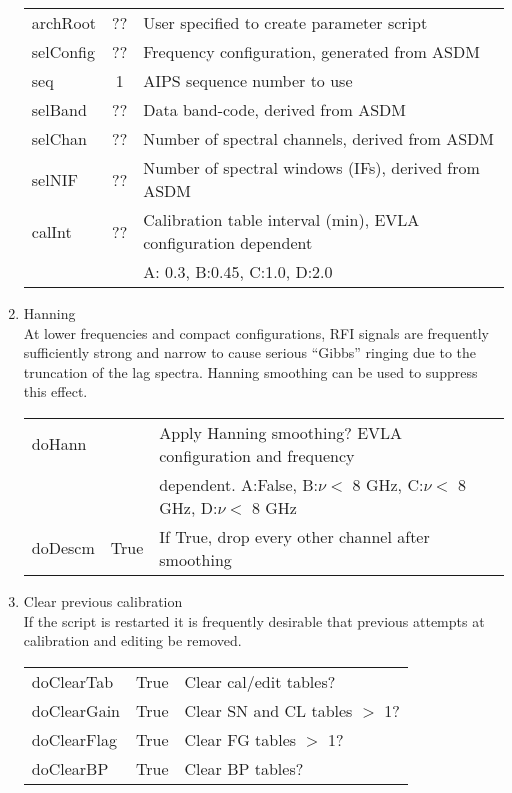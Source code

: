 \documentclass[11pt]{article}
\begin{document}
\begin{enumerate}
\begin{center}
\begin{tabular}{|l|c|l|}
archRoot  & ?? &  User specified to create parameter script\\
selConfig  & ?? &  Frequency configuration, generated from ASDM\\
seq     & 1   &  AIPS sequence number to use \\
selBand & ??  &  Data band-code, derived from ASDM\\
selChan & ??  &  Number of spectral channels, derived from ASDM\\
selNIF  & ??  &  Number of spectral windows (IFs), derived from ASDM\\
calInt  & ??  &  Calibration table interval (min), EVLA configuration
dependent\\
  &  & A: 0.3, B:0.45, C:1.0, D:2.0\\
\hline
\end{tabular}
\end{center}
%
\item Hanning \\
At lower frequencies and compact configurations, RFI signals are
frequently sufficiently strong and narrow to cause serious ``Gibbs''
ringing due to the truncation of the lag spectra.
Hanning smoothing can be used to suppress this effect.
\begin{center}
\begin{tabular}{|l|c|l|}
\hline
doHann  &  &  Apply Hanning smoothing? EVLA configuration
 and frequency \\
  &  & dependent. A:False, B:$\nu<$ 8 GHz, C:$\nu<$ 8 GHz, D:$\nu<$ 8 GHz\\
doDescm  & True  & If True, drop every other channel after smoothing  \\
\hline
\end{tabular}
\end{center}
%
\item Clear previous calibration\\
If the script is restarted it is frequently desirable that previous
attempts at calibration and editing be removed.
\begin{center}
\begin{tabular}{|l|c|l|}
\hline
doClearTab   & True & Clear cal/edit tables? \\
doClearGain  & True & Clear SN and CL tables $>$ 1? \\
doClearFlag  & True & Clear FG tables $>$ 1? \\
doClearBP    & True & Clear BP tables? \\
\hline
\end{tabular}

\end{center}
\end{enumerate}
\end{document}
